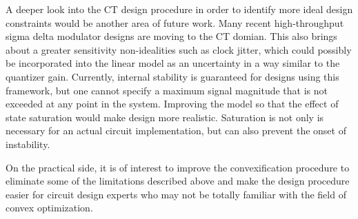 A deeper look into the \gls{CT} design procedure in order to identify more ideal design constraints would be another area of future work. Many recent high-throughput sigma delta modulator designs are moving to the \gls{CT} domian. This also brings about a greater sensitivity non-idealities such as clock jitter, which could possibly be incorporated into the linear model as an uncertainty in a way similar to the quantizer gain. Currently, internal stability is guaranteed for designs using this framework, but one cannot specify a maximum signal magnitude that is not exceeded at any point in the system. Improving the model so that the effect of state saturation would make design more realistic. Saturation is not only is necessary for an actual circuit implementation, but can also prevent the onset of instability.

On the practical side, it is of interest to improve the convexification procedure to eliminate some of the limitations described above and make the design procedure easier for circuit design experts who may not be totally familiar with the field of convex optimization.